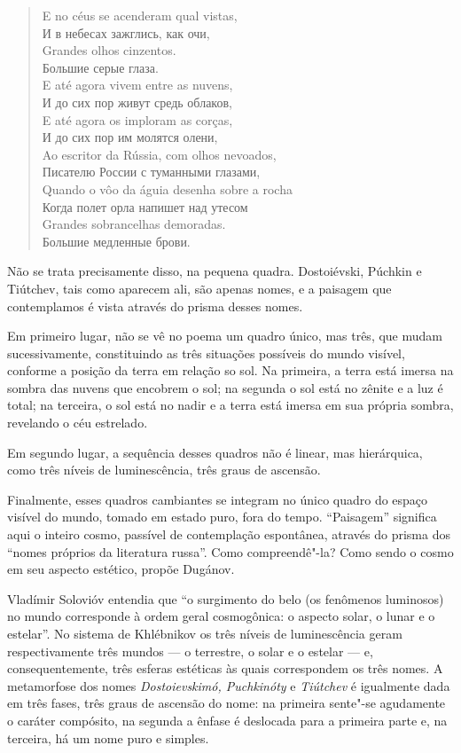 \begin{verse}
E no céus se acenderam qual vistas, \\
И в небесах зажглись, как очи, \\[8pt]
Grandes olhos cinzentos. \\
Большие серые глаза. \\[8pt]
E até agora vivem entre as nuvens, \\
И до сих пор живут средь облаков, \\[8pt]
E até agora os imploram as corças, \\
И до сих пор им молятся олени, \\[8pt]
Ao escritor da Rússia, com olhos nevoados, \\
Писателю России с туманными глазами, \\[8pt]
Quando o vôo da águia desenha sobre a \qb{}rocha \\
Когда полет орла напишет над утесом \\[8pt]
Grandes sobrancelhas demoradas. \\
Большие медленные брови.
\end{verse}

Não se trata precisamente disso, na pequena quadra. Dostoiévski, Púchkin
e Tiútchev, tais como aparecem ali, são apenas nomes, e a paisagem que
contemplamos é vista através do prisma desses nomes.

Em primeiro lugar, não se vê no poema um quadro único, mas três, que
mudam sucessivamente, constituindo as três situações possíveis do mundo
visível, conforme a posição da terra em relação so sol. Na primeira, a
terra está imersa na sombra das nuvens que encobrem o sol; na segunda o
sol está no zênite e a luz é total; na terceira, o sol está no nadir e a
terra está imersa em sua própria sombra, revelando o céu estrelado.

Em segundo lugar, a sequência desses quadros não é linear, mas
hierárquica, como três níveis de luminescência, três graus de ascensão.

Finalmente, esses quadros cambiantes se integram no único quadro do
espaço visível do mundo, tomado em estado puro, fora do tempo.
``Paisagem'' significa aqui o inteiro cosmo, passível de contemplação
espontânea, através do prisma dos ``nomes próprios da literatura russa''.
Como compreendê"-la? Como sendo o cosmo em seu aspecto estético, propõe
Dugánov.

Vladímir Solovióv entendia que ``o surgimento do belo (os fenômenos
luminosos) no mundo corresponde à ordem geral cosmogônica: o aspecto
solar, o lunar e o estelar''. No sistema de Khlébnikov os três níveis de
luminescência geram respectivamente três mundos --- o terrestre, o solar
e o estelar --- e, consequentemente, três esferas estéticas às quais
correspondem os três nomes. A metamorfose dos nomes \emph{Dostoievskimó, 
Puchkinóty} e \emph{Tiútchev} é igualmente dada em três fases, três
graus de ascensão do nome: na primeira sente"-se agudamente o caráter
compósito, na segunda a ênfase é deslocada para a primeira parte e, na
terceira, há um nome puro e simples.

